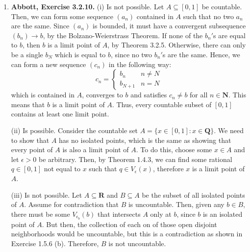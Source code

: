 \documentclass{article}
\newcommand{\N}{\mathbf{N}}
\newcommand{\Q}{\mathbf{Q}}
\newcommand{\R}{\mathbf{R}}
\newcommand{\set}[1]{\{#1\}}
\newcommand{\exc}[2][Abbott]{\item \textbf{#1, Exercise #2.}}
\newcommand{\lep}[1][L]{#1et $\epsilon > 0$ be arbitrary}
\begin{document}
\begin{enumerate}
\begin{enumerate}
        \item For (i), let $\set{E_\lambda : \lambda \in \Lambda}$ be a finite collection of closed sets. Then, 
        \begin{equation*} 
            \left(\bigcup_{\lambda \in \Lambda} E_\lambda \right)^c =
            \bigcap_{\lambda \in \Lambda} E_\lambda^c,
        \end{equation*} but, by Theorem 3.2.13, each $E_\lambda^c$ is open, so a finite intersection of them is also open (Theorem 3.2.3), thus
        \begin{equation*}
            \bigcup_{\lambda \in \Lambda} E_\lambda
        \end{equation*} is closed, again by Theorem 3.2.13. A very similar proof follows for (ii).
    \end{enumerate}
    
    \exc{3.2.10}
    (i) Is not possible. Let $A \subseteq [0, 1]$ be countable. Then, we can form some sequence $(a_n)$ contained in $A$ such that no two $a_n$ are the same. Since $(a_n)$ is bounded, it must have a convergent subsequence $(b_n) \to b$, by the Bolzano-Weierstrass Theorem. If none of the $b_n'$s are equal to $b$, then $b$ is a limit point of $A$, by Theorem 3.2.5. Otherwise, there can only be a single $b_N$ which is equal to $b$, since no two $b_n'$s are the same. Hence, we can form a new sequence $(c_n)$ in the following way:
    \begin{equation*}
        c_n = \begin{cases}
        b_n & n \neq N \\
        b_{N+1} & n = N
        \end{cases}
    \end{equation*} which is contained in $A$, converges to $b$ and satisfies $c_n \neq b$ for all $n \in \N$. This means that $b$ is a limit point of $A$. Thus, every countable subset of $[0, 1]$ contains at least one limit point.
    
    (ii) Is possible. Consider the countable set $A = \set{x \in [0, 1]: x \in \Q}$. We need to show that $A$ has no isolated points, which is the same as showing that every point of $A$ is also a limit point of $A$. To do this, choose some $x \in A$ and \lep[l]. Then, by Theorem 1.4.3, we can find some rational $q \in [0, 1]$ not equal to $x$ such that $q \in V_\epsilon(x)$, therefore $x$ is a limit point of $A$.
    
    (iii) Is not possible. Let $A \subseteq \R$ and $B \subseteq A$ be the subset of all isolated points of $A$. Assume for contradiction that $B$ is uncountable. Then, given any $b \in B$, there must be some $V_{\epsilon_b}(b)$ that intersects $A$ only at $b$, since $b$ is an isolated point of $A$. But then, the collection of each on of those open disjoint neighborhoods would be uncountable, but this is a contradiction as shown in Exercise 1.5.6 (b). Therefore, $B$ is not uncountable.
    

\end{enumerate}
\end{document}
